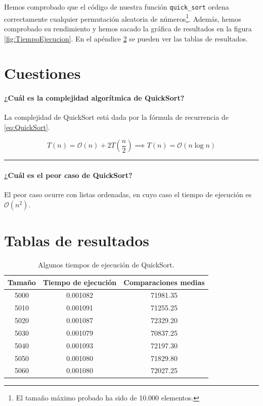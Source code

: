 \documentclass[12pt, a4paper, titlepage]{article}
\begin{document}
Hemos comprobado que el código de nuestra función \texttt{quick\_sort} ordena correctamente cualquier permutación aleatoria de números\footnote{El tamaño máximo probado ha sido de 10.000 elementos.}.
Además, hemos comprobado su rendimiento y hemos sacado la gráfica de resultados en la figura \ref{fig:TiempoEjecucion}. En el apéndice \ref{sec:Apendice} se pueden ver las tablas de resultados.

\section{Cuestiones}

\paragraph{\textcolor{green!30!black}{¿Cuál es la complejidad algorítmica de QuickSort?}} La complejidad de QuickSort está dada por la fórmula de recurrencia de \eqref{eq:QuickSort}.

\begin{equation}
T(n) = \mathcal{O}(n) + 2 T \left(\frac{n}{2}\right) \implies T(n) = \mathcal{O}(n \log n)
\label{eq:QuickSort}
\end{equation}

\vspace{10pt} %
\hrule

\paragraph{\textcolor{green!30!black}{¿Cuál es el peor caso de QuickSort?}}
El peor caso ocurre con listas ordenadas, en cuyo caso el tiempo de ejecución es $\mathcal{O}(n^2)$.

\clearpage %
\appendix
\section{Tablas de resultados}
\label{sec:Apendice}

\begin{table}[hbtp]
\centering
\begin{tabular}{c|cc}
\toprule %
\textbf{Tamaño} & \textbf{Tiempo de ejecución} & \textbf{Comparaciones medias} \\ \midrule
5000 & 0.001082 & 71981.35 \\
5010 & 0.001091 & 71255.25 \\
5020 & 0.001087 & 72329.20 \\
5030 & 0.001079 & 70837.25 \\
5040 & 0.001093 & 72197.30 \\
5050 & 0.001080 & 71829.80 \\
5060 & 0.001080 & 72027.25 \\ \bottomrule
\end{tabular}
\caption{Algunos tiempos de ejecución de QuickSort.}
\label{tab:QuickSort}
\end{table}
\end{document}
